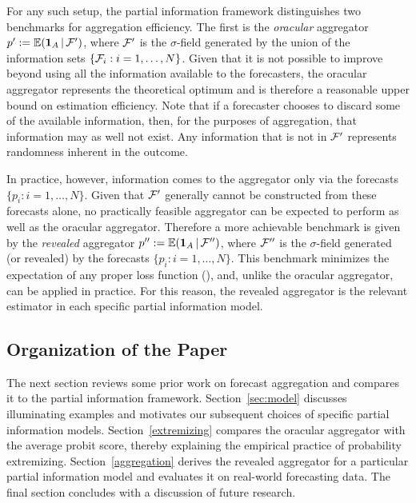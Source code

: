 \documentclass[11pt]{article}
\newcommand{\E}{\mathbb{E}}
\theoremstyle{definition}
\theoremstyle{definition}
\def\one{{\bf 1}}
\def\F{{\cal F}}
\def\E{{\mathbb E}}
\def\|{\, | \,}
\begin{document}
For any such setup, the partial information framework distinguishes two benchmarks for aggregation efficiency.  The first is the {\em oracular} aggregator
$p' := \E (\one_A \| \F')$, where $\F'$ is the $\sigma$-field
generated by the union of the information sets $\{ \F_i : i = 1, \dots,
N\}$. Given that it is not possible to improve beyond using all the information available
to the forecasters, the oracular aggregator represents the theoretical optimum and is therefore a
reasonable upper bound on estimation efficiency. Note that if a forecaster chooses to discard
some of the available information, then, for the purposes of aggregation,
that information may as well not exist. Any
information that is not in $\F'$ represents randomness inherent in the
outcome.

In practice, however, information comes to the
aggregator only via the forecasts $\{p_i : i = 1, \dots, N\}$. Given that $\F'$ generally cannot be constructed from these forecasts alone, no practically feasible aggregator can be expected to perform as well as the oracular aggregator.  Therefore a more achievable benchmark is given by the \textit{revealed} aggregator $p'' := \E (\one_A \|
\F'')$, where $\F''$ is the $\sigma$-field generated (or revealed) by the forecasts
$\{ p_i : i = 1, \dots, N \}$. This benchmark minimizes
the expectation of any proper loss function (\citealt{Ranjan08}), and,
unlike the oracular aggregator, can be applied in practice. For this
reason, the revealed aggregator is the relevant estimator in each specific partial information model.


\subsection{Organization of the Paper}

The next section reviews some prior work on forecast aggregation and compares it to the partial information framework.
Section~\ref{sec:model} discusses illuminating examples and
motivates our subsequent choices of specific partial information
models.  Section~\ref{extremizing} compares the oracular aggregator with the average probit score, thereby explaining the
empirical practice of probability extremizing.
Section~\ref{aggregation} derives the revealed aggregator for a
particular partial information model and evaluates it on real-world
forecasting data.  The final section concludes with a discussion of
future research.
\end{document}
